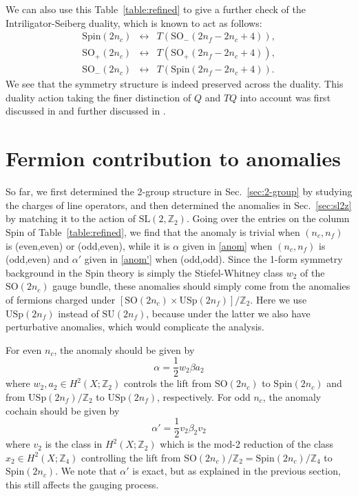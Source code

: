 \documentclass[12pt]{article}
\numberwithin{equation}{section}
\def\bZ{\mathbb{Z}}
\def\SU{\mathrm{SU}}
\def\SO{\mathrm{SO}}
\def\USp{\mathrm{USp}}
\def\Spin{\mathrm{Spin}}
\def\SL{\mathrm{SL}}
\begin{document}
We can also use this Table~\ref{table:refined}
to give a further check of the Intriligator-Seiberg duality,
which is known to act as follows:
\begin{equation}
\renewcommand{\arraystretch}{1.1}
\begin{array}{ccc}
	\Spin(2n_c) & \leftrightarrow & T(\SO_-(2n_f-2n_c+4)),\\
	\SO_+(2n_c) & \leftrightarrow & T(\SO_+(2n_f-2n_c+4)),\\ 
	\SO_-(2n_c) & \leftrightarrow & T(\Spin(2n_f-2n_c+4)).
\end{array}
\end{equation} 
We see that the symmetry structure is indeed preserved across the duality.
This duality action  taking  the finer distinction of $Q$ and $TQ$ into account was
first discussed in \cite[Sec.~6]{Gaiotto:2014kfa} and further discussed in \cite{Bhardwaj:2020ymp}.


\section{Fermion contribution to anomalies}
\label{sec:fermion}
So far, we first determined the 2-group structure in Sec.~\ref{sec:2-group} by studying the charges of line operators,
and then determined the anomalies in Sec.~\ref{sec:sl2z} by matching it to the action of $\SL(2,\bZ_2)$.
Going over  the entries on the column $\Spin$ of Table~\ref{table:refined},
we find that the anomaly is trivial when $(n_c,n_f)$ is (even,even) or (odd,even),
while it is $\alpha$ given in \eqref{anom} when $(n_c,n_f)$ is (odd,even) 
and $\alpha'$ given in \eqref{anom'} when (odd,odd).
Since the 1-form symmetry background in the $\Spin$ theory is simply the Stiefel-Whitney class $w_2$ of the $\SO(2n_c)$ gauge bundle, 
these anomalies should simply come from the anomalies of fermions charged under $[\SO(2n_c)\times \USp(2n_f)]/\bZ_2$.
Here we use $\USp(2n_f)$ instead of $\SU(2n_f)$, because under the latter we also have perturbative anomalies, which would complicate the analysis.

For even $n_c$, the anomaly should be given by  \begin{equation}
\alpha=%
\frac12 w_2 \beta a_2
\end{equation}
where $w_2,a_2\in H^2(X;\bZ_2)$ controls the lift from $\SO(2n_c)$ to $\Spin(2n_c)$
and from $\USp(2n_f)/\bZ_2$ to $\USp(2n_f)$, respectively.
For odd $n_c$, the anomaly cochain should be given by 
 \begin{equation}
\alpha'=%
 \frac12 v_2 \beta_2 v_2
\end{equation} where $v_2$ is the class in $H^2(X;\bZ_2)$ which is the mod-2 reduction of
the class $x_2 \in H^2(X;\bZ_4)$ controlling the lift from $\SO(2n_c)/\bZ_2=\Spin(2n_c)/\bZ_4$ to $\Spin(2n_c)$.
We note that $\alpha'$ is exact, but as explained in the previous section, this still affects the gauging process.
\end{document}
